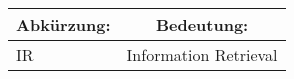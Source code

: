 \renewcommand{\arraystretch}{1.5}
\begin{center}
	\begin{tabular}{|l|l|}\hline
		\multicolumn{1}{|c|}{\textbf{Abkürzung:}} & \multicolumn{1}{c|}{\textbf{Bedeutung:}} \\ \hline
		IR & Information Retrieval \\ \hline	
	\end{tabular}
\end{center}
